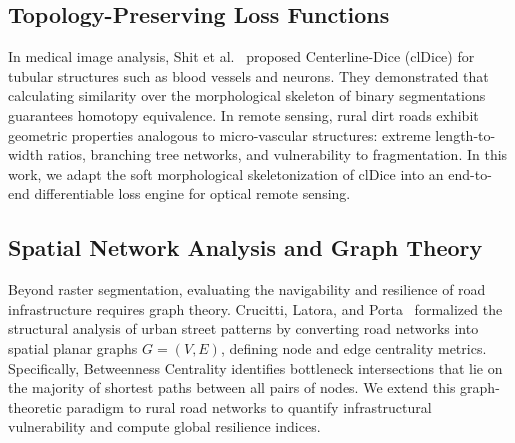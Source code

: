 \documentclass[conference]{IEEEtran}
\begin{document}
\subsection{Topology-Preserving Loss Functions}
In medical image analysis, Shit et al.~\cite{shit2021cldice} proposed Centerline-Dice (clDice) for tubular structures such as blood vessels and neurons. They demonstrated that calculating similarity over the morphological skeleton of binary segmentations guarantees homotopy equivalence. In remote sensing, rural dirt roads exhibit geometric properties analogous to micro-vascular structures: extreme length-to-width ratios, branching tree networks, and vulnerability to fragmentation. In this work, we adapt the soft morphological skeletonization of clDice into an end-to-end differentiable loss engine for optical remote sensing.

\subsection{Spatial Network Analysis and Graph Theory}
Beyond raster segmentation, evaluating the navigability and resilience of road infrastructure requires graph theory. Crucitti, Latora, and Porta~\cite{crucitti2006centrality} formalized the structural analysis of urban street patterns by converting road networks into spatial planar graphs $G = (V, E)$, defining node and edge centrality metrics. Specifically, Betweenness Centrality identifies bottleneck intersections that lie on the majority of shortest paths between all pairs of nodes. We extend this graph-theoretic paradigm to rural road networks to quantify infrastructural vulnerability and compute global resilience indices.

\begin{table}[t]
\centering
\caption{Comparative Summary of Existing Paradigms vs. Proposed MobileViT-Graph Architecture}
\label{tab:paradigm_comparison}
\end{table}
\end{document}
